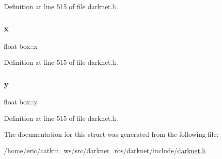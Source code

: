 Definition at line 515 of file darknet.\+h.

\mbox{\label{structbox_a26adb5cfaf492245aba926b2f212b712}} 
\subsubsection{\texorpdfstring{x}{x}}
{\footnotesize\ttfamily float box\+::x}



Definition at line 515 of file darknet.\+h.

\mbox{\label{structbox_ab25e5389fd474ccd83c7dfcf0b1f9957}} 
\subsubsection{\texorpdfstring{y}{y}}
{\footnotesize\ttfamily float box\+::y}



Definition at line 515 of file darknet.\+h.



The documentation for this struct was generated from the following file\+:\begin{DoxyCompactItemize}
\item 
/home/eric/catkin\+\_\+ws/src/darknet\+\_\+ros/darknet/include/\mbox{\hyperlink{darknet_8h}{darknet.\+h}}\end{DoxyCompactItemize}
